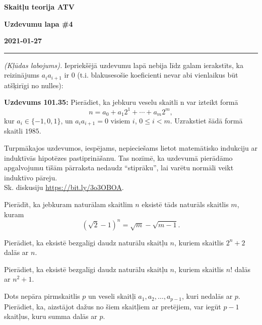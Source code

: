 \documentclass[a4paper,12pt]{article}
\begin{document}
\clearpage
\begin{center}
\parbox{3.5cm}{\flushleft\bf Skaitļu teorija \newline ATV} \hfill {\bf\LARGE Uzdevumu lapa \#4} \hfill \parbox{3.5cm}{\flushright\bf 2021-01-27} %
\end{center}

\hrule

\vspace{10pt}
{\em (Kļūdas labojums).} Iepriekšējā uzdevumu lapā nebija līdz galam ierakstīts, ka
reizinājums $a_ia_{i+1}$ ir $0$ (t.i. blakusesošie koeficienti nevar abi vienlaikus būt 
atšķirīgi no nulles):

\vspace{10pt}
{\bf Uzdevums 101.35:} Pierādiet, ka jebkuru veselu skaitli n var izteikt formā
$$n = a_0 + a_1 2^1 + \cdots  + a_m2^m,$$
kur $a_i \in \{ -1,0,1\}$, un $a_ia_{i+1} = 0$ visiem $i$, $0 \leq i < m$.
Uzrakstiet šādā formā skaitli $1985$.


\vspace{20pt}
Turpmākajos uzdevumos, iespējams, nepieciešams 
lietot matemātisko indukciju ar induktīvās hipotēzes pastiprināšanu. 
Tas nozīmē, ka uzdevumā pierādāmo apgalvojumu tīšām pārraksta nedaudz ``stiprāku'', 
lai varētu normāli veikt induktīvo pāreju.\\
Sk. diskusiju \url{https://bit.ly/3o3OBOA}.


\vspace{10pt}
\begin{problem}
Pierādīt, ka jebkuram naturālam skaitlim $n$ eksistē tāds naturāls skaitlis $m$, kuram
\[ \left( \sqrt{2} - 1 \right)^n = \sqrt{m} - \sqrt{m-1}. \]
\end{problem}


\vspace{10pt}
\begin{problem}
Pierādiet, ka eksistē bezgalīgi daudz naturālu skaitļu $n$, kuriem skaitlis $2^n+2$  dalās ar $n$.
\end{problem}



\vspace{10pt}
\begin{problem}
Pierādiet, ka eksistē bezgalīgi daudz naturālu skaitļu $n$, kuriem skaitlis $n!$ dalās ar $n^2 + 1$.
\end{problem}



\vspace{10pt}
\begin{problem}
Dots nepāra pirmskaitlis $p$ un veseli skaitļi $a_1,a_2,\ldots,a_{p-1}$, kuri nedalās ar $p$. 
Pierādiet, ka, aizstājot dažus no šiem skaitļiem ar pretējiem, var iegūt $p-1$ skaitļus, kuru summa dalās ar $p$.
\end{problem}
\end{document}
